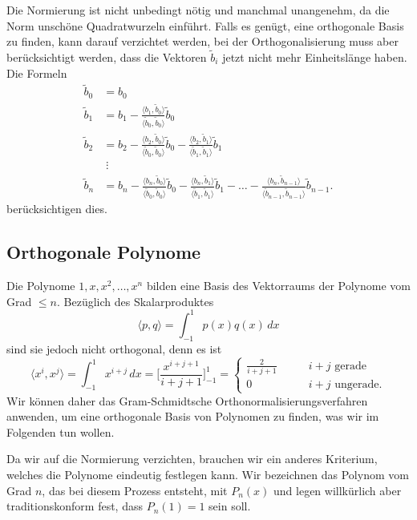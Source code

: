 Die Normierung ist nicht unbedingt nötig und manchmal unangenehm,
da die Norm unschöne Quadratwurzeln einführt.
Falls es genügt, eine orthogonale Basis zu finden, kann darauf
verzichtet werden, bei der Orthogonalisierung muss aber berücksichtigt
werden, dass die Vektoren $\tilde{b}_i$ jetzt nicht mehr Einheitslänge
haben.
Die Formeln
\begin{align*}
\tilde{b}_0
&=
b_0
\\
\tilde{b}_1
&=
b_1
-
\frac{\langle b_1,\tilde{b}_0\rangle}{\langle \tilde{b}_0,\tilde{b}_0\rangle}\tilde{b}_0
\\
\tilde{b}_2
&=
b_2
-
\frac{\langle b_2,\tilde{b}_0\rangle}{\langle \tilde{b}_0,\tilde{b}_0\rangle}\tilde{b}_0
-
\frac{\langle b_2,\tilde{b}_1\rangle}{\langle \tilde{b}_1,\tilde{b}_1\rangle}\tilde{b}_1
\\
&\;\vdots
\\
\tilde{b}_n
&=
b_n
-
\frac{\langle b_n,\tilde{b}_0\rangle}{\langle \tilde{b}_0,\tilde{b}_0\rangle}\tilde{b}_0
-
\frac{\langle b_n,\tilde{b}_1\rangle}{\langle \tilde{b}_1,\tilde{b}_1\rangle}\tilde{b}_1
-
\dots
-
\frac{\langle b_n,\tilde{b}_{n-1}\rangle}{\langle \tilde{b}_{n-1},\tilde{b}_{n-1}\rangle}\tilde{b}_{n-1}.
\end{align*}
berücksichtigen dies.


%
%
\subsection{Orthogonale Polynome
\label{buch:integral:subsection:orthogonale-polynome}}
Die Polynome $1,x,x^2,\dots,x^n$ bilden eine Basis des Vektorraums
der Polynome vom Grad $\le n$.
Bezüglich des Skalarproduktes
\[
\langle p,q\rangle
=
\int_{-1}^1 p(x)q(x)\,dx
\]
sind sie jedoch nicht orthogonal, denn es ist
\[
\langle x^i,x^j\rangle
=
\int_{-1}^1 x^{i+j}\,dx
=
\biggl[\frac{x^{i+j+1}}{i+j+1}\biggr]_{-1}^1
=
\begin{cases}
\displaystyle
\frac{2}{i+j+1}&\qquad\text{$i+j$ gerade}\\
              0&\qquad\text{$i+j$ ungerade}.
\end{cases}
\]
Wir können daher das Gram-Schmidtsche Orthonormalisierungsverfahren
anwenden, um eine orthogonale Basis von Polynomen zu finden, was
wir im Folgenden tun wollen.


Da wir auf die Normierung verzichten, brauchen wir ein anderes
Kriterium, welches die Polynome eindeutig festlegen kann.
Wir bezeichnen das Polynom vom Grad $n$, das bei diesem Prozess
entsteht, mit $P_n(x)$ und legen willkürlich aber traditionskonform
fest, dass $P_n(1)=1$ sein soll.

